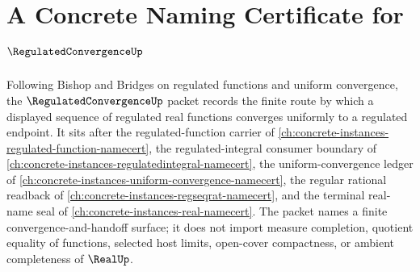 \chapter{A Concrete Naming Certificate for $\RegulatedConvergenceUp$}
\label{ch:concrete-instances-regulated-convergence-namecert}

Following Bishop and Bridges on regulated functions and uniform convergence, the $\RegulatedConvergenceUp$ packet records the finite route by which a displayed sequence of regulated real functions converges uniformly to a regulated endpoint. It sits after the regulated-function carrier of \autoref{ch:concrete-instances-regulated-function-namecert}, the regulated-integral consumer boundary of \autoref{ch:concrete-instances-regulatedintegral-namecert}, the uniform-convergence ledger of \autoref{ch:concrete-instances-uniform-convergence-namecert}, the regular rational readback of \autoref{ch:concrete-instances-regseqrat-namecert}, and the terminal real-name seal of \autoref{ch:concrete-instances-real-namecert}. The packet names a finite convergence-and-handoff surface; it does not import measure completion, quotient equality of functions, selected host limits, open-cover compactness, or ambient completeness of $\RealUp$.

